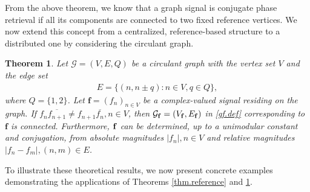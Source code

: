 \documentclass[12pt,oneside,reqno]{amsart}
\newtheorem{theorem}{Theorem}[section]
\numberwithin{equation}{section}
\begin{document}
	
	From the above theorem, we know that a graph signal is conjugate phase retrieval  if all its components are connected to two fixed reference vertices. We now extend this concept from a centralized, reference-based structure to a distributed one by considering the circulant graph. 
	
	
	\begin{theorem}\label{PW.adj.thm1}
		Let $\mathcal{G} = (V, E,Q)$ be a circulant graph with the vertex set $V$ and the edge set
		\begin{align*}%
			E=\{(n,n\pm q): n\in V, q\in Q \},
		\end{align*} 
		where $Q=\{1,2\}$. Let
		$\mathbf{f}= (f_n)_{n\in V}$ be a complex-valued signal residing on the graph.  If $f_n\overline{f_{n+1}}\neq f_{n+1} \overline{f_n}, n\in V$, then $\mathcal{G}_{\bf f} = (V_{\bf f},E_{\bf f})$ in \eqref{gf.def} corresponding to  $\mathbf{f}$ is connected. Furthermore,  $\bf f$ can be determined, up to a unimodular constant and conjugation, from absolute magnitudes $ |f_n|, n\in V$ and relative magnitudes $|f_{n}-f_m|, (n,m)\in E$.
	\end{theorem}
	
	
	To illustrate these theoretical results, we now present concrete examples demonstrating the applications of Theorems \ref{thm.reference} and \ref{PW.adj.thm1}.
	
	
	
\end{document}
